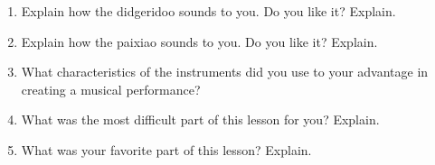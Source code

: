 \documentclass[letterpaper,12pt]{scrartcl}
\begin{document}
\begin{enumerate}
\begin{enumerate}
		\item Explain how the didgeridoo sounds to you. Do you like it? Explain. \vspace{20mm}
		\item Explain how the paixiao sounds to you. Do you like it? Explain. \vspace{20mm}
		\item What characteristics of the instruments did you use to your advantage in creating a musical performance?  \vspace{20mm}
		\item What was the most difficult part of this lesson for you? Explain. \vspace{20mm}
		\item What was your favorite part of this lesson? Explain. 
		
	\end{enumerate}
	
	
\end{enumerate}


\end{document}
